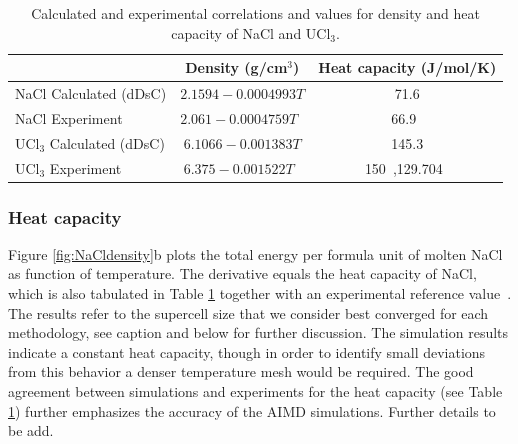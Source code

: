 \documentclass[preprint,3p,10pt,twocolumn,number,sort&compress]{elsarticle}
\begin{document}

\begin{table}[hb!]
\centering
\begin{tabular}{lcc}
\hline
\hline
& Density (g/cm$^3$) &Heat capacity (J/mol/K) \\
\hline
NaCl Calculated (dDsC)	&$2.1594-0.0004993T$ &71.6 \\
NaCl Experiment	&$2.061-0.0004759T$~\cite{Janz1988} &66.9~\cite{NIST}  \\
UCl$_3$ Calculated (dDsC) &$6.1066-0.001383T$ &145.3 \\	
UCl$_3$ Experiment	&$6.375-0.001522T$~\cite{Desyatnik} &150~\cite{BENES2008},129.704~\cite{YIN2020} \\
\hline
\hline
\end{tabular}
\caption{Calculated and experimental correlations and values for density and heat capacity of NaCl and UCl$_3$.}%
\label{table:NaCldensityetc}
\end{table}

\subsubsection{Heat capacity} 
Figure \ref{fig:NaCldensity}b plots the total energy per formula unit of molten NaCl as function of temperature. The derivative equals the heat capacity of NaCl, which is also tabulated in Table \ref{table:NaCldensityetc} together with an experimental reference value~\cite{NIST}. The results refer to the supercell size that we consider best converged for each methodology, see caption and below for further discussion. The simulation results indicate a constant heat capacity, though in order to identify small deviations from this behavior a denser temperature mesh would be required. The good agreement between simulations and experiments for the heat capacity (see Table \ref{table:NaCldensityetc}) further emphasizes the accuracy of the AIMD simulations. {\color{red}Further details to be add.}
\end{document}

